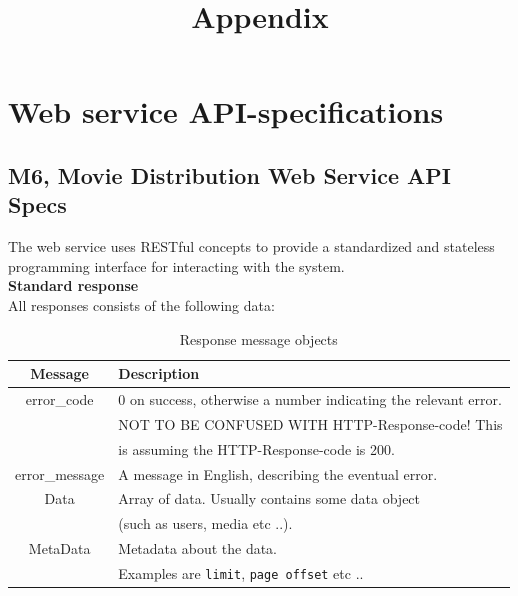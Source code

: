 \documentclass[11pt]{article}
\title{Appendix}
\begin{document}
\maketitle

\setcounter{tocdepth}{3}
\tableofcontents
\setcounter{page}{23}
\vspace*{1cm}

\newpage

\section{Web service API-specifications}
\subsection{M6, Movie Distribution Web Service API Specs}

The web service uses RESTful concepts to provide a standardized and stateless programming interface for interacting with the system. \\

\textbf{Standard response} \\
All responses consists of the following data:

\begin{table}[H]
\caption{Response message objects}
\begin{center}
\begin{tabular}{|c|l|}
\hline
 Message                     &  Description                                               \\
\hline
 error\_code   &  0 on success, otherwise a number indicating the relevant error.  \\
                             &  NOT TO BE CONFUSED WITH HTTP-Response-code! This   \\
                             &  is assuming the HTTP-Response-code is 200.                \\
\hline
 error\_message  &  A message in English, describing the eventual error.      \\
\hline
Data & Array of data. Usually contains some data object \\
	& (such as users, media etc ..).
\\
\hline
MetaData & Metadata about the data. \\
	& Examples are \texttt{limit}, \texttt{page offset} etc .. \\
\hline
\end{tabular}
\end{center}
\end{table}
\end{document}
